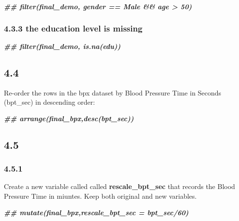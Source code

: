 \documentclass[
]{book}
\newenvironment{Shaded}{\begin{snugshade}}{\end{snugshade}}
\newcommand{\DocumentationTok}[1]{\textcolor[rgb]{0.56,0.35,0.01}{\textbf{\textit{#1}}}}
\begin{document}
\begin{Shaded}
\begin{Highlighting}[]
\DocumentationTok{\#\# filter(final\_demo, gender == \textquotesingle{}Male\textquotesingle{} \&\& age \textgreater{} 50)}
\end{Highlighting}
\end{Shaded}

\hypertarget{the-education-level-is-missing}{%
\subsubsection{4.3.3 the education level is missing}\label{the-education-level-is-missing}}

\begin{Shaded}
\begin{Highlighting}[]
\DocumentationTok{\#\# filter(final\_demo, is.na(edu))}
\end{Highlighting}
\end{Shaded}

\hypertarget{section-20}{%
\subsection{4.4}\label{section-20}}

Re-order the rows in the bpx dataset by Blood Pressure Time in Seconds (bpt\_sec) in descending order:

\begin{Shaded}
\begin{Highlighting}[]
\DocumentationTok{\#\# arrange(final\_bpx,desc(bpt\_sec))}
\end{Highlighting}
\end{Shaded}

\hypertarget{section-21}{%
\subsection{4.5}\label{section-21}}

\hypertarget{section-22}{%
\subsubsection{4.5.1}\label{section-22}}

Create a new variable called called \textbf{rescale\_bpt\_sec} that records the Blood Pressure Time in miuntes. Keep both original and new variables.

\begin{Shaded}
\begin{Highlighting}[]
\DocumentationTok{\#\#  mutate(final\_bpx,rescale\_bpt\_sec = bpt\_sec/60)}
\end{Highlighting}
\end{Shaded}
\end{document}

